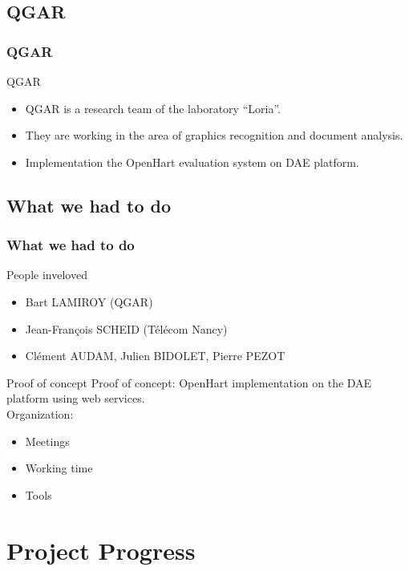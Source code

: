 \documentclass[c]{beamer}
\begin{document}
\subsection{QGAR}
\begin{frame}
   \frametitle{ QGAR }
   \begin{block}{QGAR}
   \begin{itemize}
	   \item QGAR is a research team of the laboratory “Loria”.
	   \item They are working in the area of graphics recognition and document analysis.
	   \item Implementation the OpenHart evaluation system on DAE platform.   
	\end{itemize}
	\end{block}
\end{frame}

\subsection{What we had to do}

\begin{frame}
   \frametitle{ What we had to do}
   \begin{block}{People inveloved}
	\begin{itemize}
	   \item Bart LAMIROY (QGAR)
	   \item Jean-François SCHEID (Télécom Nancy)
	   \item Clément AUDAM, Julien BIDOLET, Pierre PEZOT
	 \end{itemize}
	\end{block}
	\begin{block}{Proof of concept}
	Proof of concept: OpenHart implementation on the DAE platform using web services.
	\\Organization:
	   \begin{itemize}
		   \item Meetings
		   \item Working time
		   \item Tools
	   \end{itemize}
	\end{block}
	\end{frame}
			    

\section{Project Progress}
\end{document}
